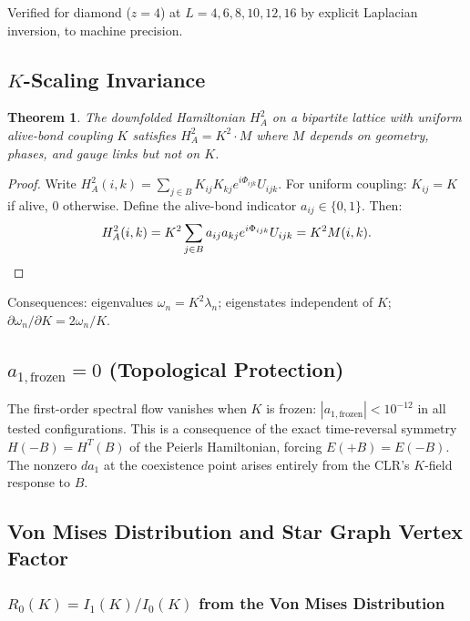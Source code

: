 \documentclass[aps,prd,onecolumn,superscriptaddress,floatfix,12pt]{revtex4-2}
\newcommand{\Rzero}{R_0}
\newtheorem{theorem}{Theorem}[section]
\begin{document}
Verified for diamond ($z = 4$) at $L = 4, 6, 8, 10, 12, 16$ by explicit Laplacian inversion, to machine precision.

\subsection{$K$-Scaling Invariance}\label{sec:A2}

\begin{theorem}
The downfolded Hamiltonian $H^2_A$ on a bipartite lattice with uniform alive-bond coupling $K$ satisfies $H^2_A = K^2 \cdot M$ where $M$ depends on geometry, phases, and gauge links but not on $K$.
\end{theorem}

\begin{proof}
Write $H^2_A(i,k) = \sum_{j \in B} K_{ij} K_{kj} e^{i\Phi_{ijk}} U_{ijk}$. For uniform coupling: $K_{ij} = K$ if alive, $0$ otherwise. Define the alive-bond indicator $a_{ij} \in \{0, 1\}$. Then:
\[
H^2_A(i,k) = K^2 \sum_{j \in B} a_{ij} a_{kj} e^{i\Phi_{ijk}} U_{ijk} = K^2 M(i,k).  \qedhere
\]
\end{proof}

Consequences: eigenvalues $\omega_n = K^2 \lambda_n$; eigenstates independent of $K$; $\partial\omega_n/\partial K = 2\omega_n/K$.

\subsection{$a_{1,\text{frozen}} = 0$ (Topological Protection)}\label{sec:A3}

The first-order spectral flow vanishes when $K$ is frozen: $|a_{1,\text{frozen}}| < 10^{-12}$ in all tested configurations. This is a consequence of the exact time-reversal symmetry $H(-B) = H^T(B)$ of the Peierls Hamiltonian, forcing $E(+B) = E(-B)$. The nonzero $da_1$ at the coexistence point arises entirely from the CLR's $K$-field response to $B$.

\subsection{Von Mises Distribution and Star Graph Vertex Factor}\label{sec:A4}

\subsubsection{$\Rzero(K) = I_1(K)/I_0(K)$ from the Von Mises Distribution}
\end{document}
